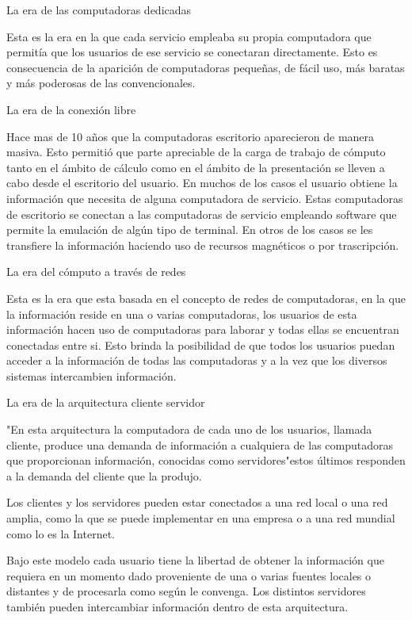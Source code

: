La era de las computadoras dedicadas

Esta es la era en la que cada servicio empleaba su propia computadora que permitía que los usuarios de ese servicio se 
conectaran directamente. Esto es consecuencia de la aparición de computadoras pequeñas, de fácil uso, más baratas y más 
poderosas de las convencionales.

La era de la conexión libre

Hace mas de 10 años que la computadoras escritorio aparecieron de manera masiva. Esto permitió que parte apreciable de la 
carga de trabajo de cómputo tanto en el ámbito de cálculo como en el ámbito de la presentación se lleven a cabo desde el 
escritorio del usuario. En muchos de los casos el usuario obtiene la información que necesita de alguna computadora de servicio. 
Estas computadoras de escritorio se conectan a las computadoras de servicio empleando software que permite la emulación de algún 
tipo de terminal. En otros de los casos se les transfiere la información haciendo uso de recursos magnéticos o por trascripción.

La era del cómputo a través de redes

Esta es la era que esta basada en el concepto de redes de computadoras, en la que la información reside en una o varias computadoras, 
los usuarios de esta información hacen uso de computadoras para laborar y todas ellas se encuentran conectadas entre si. Esto brinda 
la posibilidad de que todos los usuarios puedan acceder a la información de todas las computadoras y a la vez que los diversos sistemas
intercambien información.


La era de la arquitectura cliente servidor

"En esta arquitectura la computadora de cada uno de los usuarios, llamada cliente, produce una demanda de información a cualquiera de 
las computadoras que proporcionan información, conocidas como servidores"estos últimos responden a la demanda del cliente que la produjo.

Los clientes y los servidores pueden estar conectados a una red local o una red amplia, como la que se puede implementar en una empresa 
o a una red mundial como lo es la Internet.

Bajo este modelo cada usuario tiene la libertad de obtener la información que requiera en un momento dado proveniente de una o varias 
fuentes locales o distantes y de procesarla como según le convenga. Los distintos servidores también pueden intercambiar información 
dentro de esta arquitectura.



